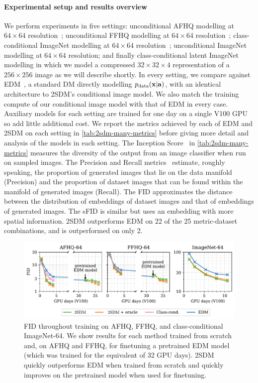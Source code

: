 \paragraph{Experimental setup and results overview}

We perform experiments in five settings: unconditional AFHQ modelling at $64\times64$ resolution~\citep{choi2020stargan}; unconditional FFHQ modelling at $64\times64$ resolution~\citep{karras2018style}; class-conditional ImageNet modelling at $64\times64$ resolution~\citep{deng2009imagenet}; unconditional ImageNet modelling at $64\times64$ resolution; and finally class-conditional latent ImageNet modelling in which we model a compressed $32\times32\times4$ representation of a $256\times256$ image as we will describe shortly. In every setting, we compare against EDM~\citep{karras2022elucidating}, a standard DM directly modelling $p_{\rm{data}}({\mathbf{x}}|{\mathbf{a}})$, with an identical architecture to 2SDM's conditional image model. We also match the training compute of our conditional image model with that of EDM in every case. Auxiliary models for each setting are trained for one day on a single V100 GPU so add little additional cost. We report the metrics achieved by each of EDM and 2SDM on each setting in \cref{tab:2sdm-many-metrics} before giving more detail and analysis of the models in each setting. The Inception Score~\citep{salimans2016improved,barratt2018note} in \cref{tab:2sdm-many-metrics} measures the diversity of the output from an image classifier when run on sampled images. The Precision and Recall metrics~\citep{kynkaanniemi2019improved} estimate, roughly speaking, the proportion of generated images that lie on the data manifold (Precision) and the proportion of dataset images that can be found within the manifold of generated images (Recall). The FID approximates the distance between the distribution of embeddings of dataset images and that of embeddings of generated images. The sFID is similar but uses an embedding with more spatial information. 2SDM outperforms EDM on 22 of the 25 metric-dataset combinations, and is outperformed on only 2.


\begin{figure}[t]
    \centering
    \includegraphics[width=\textwidth]{figs/2sdm/cond-results-1.pdf}
    \caption{FID throughout training on AFHQ, FFHQ, and class-conditional ImageNet-64. We show results for each method trained from scratch and, on AFHQ and FFHQ, for finetuning a pretrained EDM model (which was trained for the equivalent of 32 GPU days). 2SDM quickly outperforms EDM when trained from scratch and quickly improves on the pretrained model when used for finetuning.}
    \label{fig:fid_vs_training}
\end{figure}


